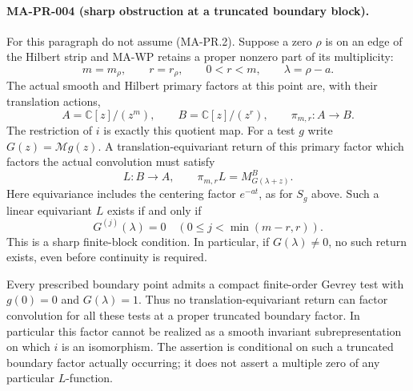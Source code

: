 \paragraph{MA-PR-004 (sharp obstruction at a truncated boundary block).}
For this paragraph do not assume (MA-PR.2).
Suppose a zero $\rho$ is on an edge of the Hilbert strip and
MA-WP retains a proper nonzero part of its multiplicity:
\[
       m=m_\rho,\qquad r=r_\rho,\qquad 0<r<m,\qquad
                         \lambda=\rho-a .
\tag{MA-PR.24}
\]
The actual smooth and Hilbert primary factors at this point
are, with their translation actions,
\[
 A=\mathbb C[z]/(z^m),\qquad B=\mathbb C[z]/(z^r),
 \qquad \pi_{m,r}:A\longrightarrow B .
\tag{MA-PR.25}
\]
The restriction of $i$ is exactly this quotient map.
For a test $g$ write $G(z)=\mathcal Mg(z)$.
A translation-equivariant return of this primary factor
which factors the actual convolution must satisfy
\[
 L:B\longrightarrow A,\qquad
       \pi_{m,r}L=M_{G(\lambda+z)}^B .
\tag{MA-PR.26}
\]
Here equivariance includes the centering factor
$e^{-at}$, as for $S_g$ above.
Such a linear equivariant $L$ exists if and only if
\[
     G^{(j)}(\lambda)=0
           \quad(0\le j<\min(m-r,r)).
\tag{MA-PR.27}
\]
This is a sharp finite-block condition.  In particular,
if $G(\lambda)\ne0$, no such return exists, even before
continuity is required.

Every prescribed boundary point admits a compact
finite-order Gevrey test with $g(0)=0$ and
$G(\lambda)=1$.  Thus no translation-equivariant
return can factor convolution for all these tests
at a proper truncated boundary factor.  In particular
this factor cannot be realized as a smooth invariant
subrepresentation on which $i$ is an isomorphism.
The assertion is conditional on such a truncated
boundary factor actually occurring; it does not
assert a multiple zero of any particular $L$-function.

